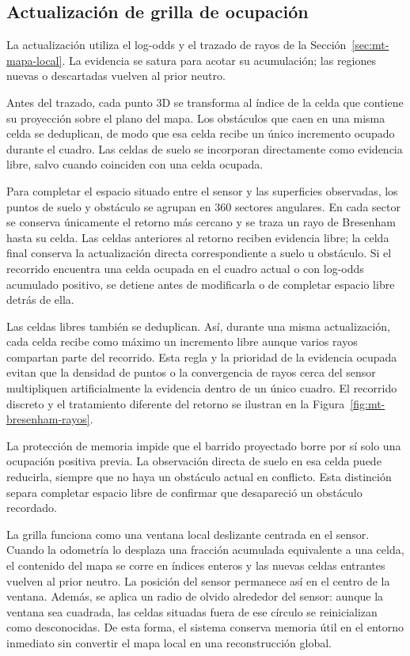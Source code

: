\subsection{Actualización de grilla de ocupación}
\label{sec:metodo-v2-ocupacion}

La actualización utiliza el log-odds y el trazado de rayos de la Sección~\ref{sec:mt-mapa-local}.
La evidencia se satura para acotar su acumulación; las regiones nuevas o descartadas vuelven al
prior neutro.

Antes del trazado, cada punto 3D se transforma al índice de la celda que contiene su proyección
sobre el plano del mapa. Los obstáculos que caen en una misma celda se deduplican, de modo que esa
celda recibe un único incremento ocupado durante el cuadro. Las celdas de suelo se incorporan
directamente como evidencia libre, salvo cuando coinciden con una celda ocupada.

Para completar el espacio situado entre el sensor y las superficies observadas, los puntos de
suelo y obstáculo se agrupan en 360 sectores angulares. En cada sector se conserva únicamente el
retorno más cercano y se traza un rayo de Bresenham hasta su celda. Las celdas anteriores al retorno
reciben evidencia libre; la celda final conserva la actualización directa correspondiente a suelo
u obstáculo. Si el recorrido encuentra una celda ocupada en el cuadro actual o con log-odds acumulado
positivo, se detiene antes de modificarla o de completar espacio libre detrás de ella.

Las celdas libres también se deduplican. Así, durante una misma actualización, cada celda recibe
como máximo un incremento libre aunque varios rayos compartan parte del recorrido. Esta regla y la
prioridad de la evidencia ocupada evitan que la densidad de puntos o la convergencia de rayos cerca
del sensor multipliquen artificialmente la evidencia dentro de un único cuadro. El recorrido
discreto y el tratamiento diferente del retorno se ilustran en la
Figura~\ref{fig:mt-bresenham-rayos}.

La protección de memoria impide que el barrido proyectado borre por sí solo una ocupación
positiva previa. La observación directa de suelo en esa celda puede reducirla, siempre que no
haya un obstáculo actual en conflicto. Esta distinción separa completar espacio libre de
confirmar que desapareció un obstáculo recordado.

La grilla funciona como una ventana local deslizante centrada en el sensor. Cuando la odometría lo
desplaza una fracción acumulada equivalente a una celda, el contenido del mapa se corre en índices enteros y las
nuevas celdas entrantes vuelven al prior neutro. La posición del sensor permanece así en el centro
de la ventana. Además, se aplica un radio de olvido alrededor del sensor: aunque la ventana sea cuadrada, las celdas situadas
fuera de ese círculo se reinicializan como desconocidas. De esta forma, el sistema conserva memoria
útil en el entorno inmediato sin convertir el mapa local en una reconstrucción global.

